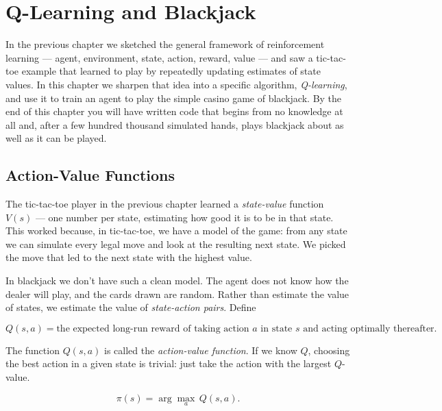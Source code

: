 \documentclass[../../book.tex]{subfiles}
\begin{document}
\chapter{Q-Learning and Blackjack}
\label{rl_blackjack}


In the previous chapter we sketched the general framework of reinforcement learning --- agent, environment, state, action, reward, value --- and saw a tic-tac-toe example that learned to play by repeatedly updating estimates of state values.  In this chapter we sharpen that idea into a specific algorithm, \emph{Q-learning}, and use it to train an agent to play the simple casino game of blackjack.  By the end of this chapter you will have written code that begins from no knowledge at all and, after a few hundred thousand simulated hands, plays blackjack about as well as it can be played.

\section{Action-Value Functions}


The tic-tac-toe player in the previous chapter learned a \emph{state-value} function $V(s)$ --- one number per state, estimating how good it is to be in that state.  This worked because, in tic-tac-toe, we have a model of the game: from any state we can simulate every legal move and look at the resulting next state.  We picked the move that led to the next state with the highest value.

In blackjack we don't have such a clean model.  The agent does not know how the dealer will play, and the cards drawn are random.  Rather than estimate the value of states, we estimate the value of \emph{state-action pairs}.  Define

\begin{equation*}
    Q(s, a) = \text{the expected long-run reward of taking action } a \text{ in state } s \text{ and acting optimally thereafter.}
\end{equation*}

\noindent The function $Q(s, a)$ is called the \emph{action-value function}.  If we know $Q$, choosing the best action in a given state is trivial: just take the action with the largest $Q$-value.

\begin{equation*}
    \pi(s) = \arg\max_a\, Q(s, a).
\end{equation*}
\end{document}
